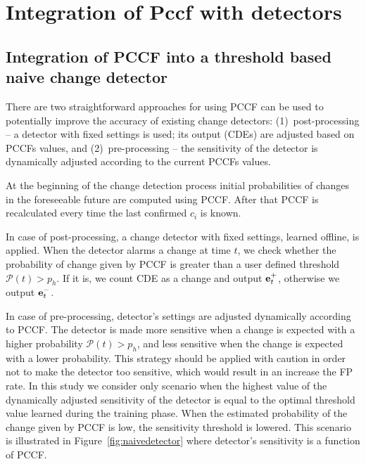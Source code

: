 \chapter{Integration of Pccf with detectors}

\section{Integration of PCCF into a threshold based naive change detector}
\label{sec:pccf_integration_naive}
There are two straightforward approaches for using PCCF can be used to potentially improve the accuracy of existing change detectors:
(1)~post-processing -- a detector with fixed settings is used; its output (CDEs) are adjusted based on PCCFs values,
and (2)~pre-processing -- the sensitivity of the detector is dynamically adjusted according to the current PCCFs values.

At the beginning of the change detection process initial probabilities of changes in the foreseeable future are computed using PCCF.
After that PCCF is recalculated every time the last confirmed $c_i$ is known.

In case of post-processing, a change detector with fixed settings, learned offline, is applied.
When the detector alarms a change at time $t$, we check whether the probability of change given by PCCF is greater than a user defined threshold $\mathcal{P}(t) > p_h$.
If it is, we count CDE as a change and output $\mathbf{e}_{t}^{+}$, otherwise we output $\mathbf{e}_{t}^{-}$.

In case of pre-processing, detector's settings are adjusted dynamically according to PCCF. The detector is made more sensitive when a change is expected with a higher probability $\mathcal{P}(t) > p_h$, and less sensitive when the change is expected with a lower probability.
This strategy should be applied with caution in order not to make the detector too sensitive, which would result in an increase the FP rate.
In this study we consider only scenario when the highest value of the dynamically adjusted sensitivity of the detector is equal to the optimal threshold value learned during the training phase.
When the estimated probability of the change given by PCCF is low, the sensitivity threshold is lowered.
This scenario is illustrated in Figure~\ref{fig:naivedetector} where detector's sensitivity is a function of PCCF.

